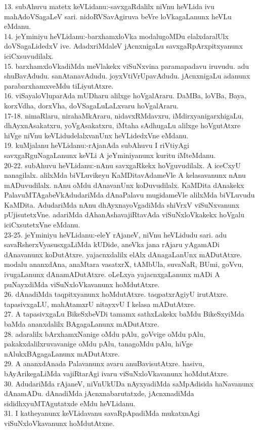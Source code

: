 \documentclass{article}
\begin{document}
13. subAhuvu matetx keVLidanu:-savxgaRdalilx niVnu heVLida ivu mahAdoVSagaLeV sari. nidoRVSavAgiruva beVre loVkagaLanunx heVLu eMdanu.\\
14. jeYminiyu heVLidanu:-barxhamxloVka modalugoMDu elalxdaralUlx doVSagaLidedxV ive. AdadxriMdaleV jAcnxnigaLu savxgaRpArxpitxyanunx iciCxsuvudilalx.\\
15. barxhamxloVkadiMda meVlakekx viSuNxvina paramapadavu iruvudu. adu shuBavAdudu. sanAtanavAdudu. joyxVtiVrUpavAdudu. jAcnxnigaLu adanunx parabarxhamxveMdu tiLiyutAtxre.\\
16. viSayaloVluparAda mUDharu alilxge hoVgalAraru. DaMBa, loVBa, Baya, korxVdha, dorxVha, doVSagaLuLaLxvaru hoVgalAraru.\\
17-18. nimaRlaru, nirahaMkAraru, nidavxRMdavxru, iMdirxyanigarxhigaLu, dhAyxnAsakatxru, yoVgAsakatxru, iMtaha sAdhugaLu alilxge hoVgutAtxre hiVge niVnu keVLidudelalxvanUnx heVLidedxVne eMdanu.\\
19. kuMjalanu heVLidanu:-rAjanAda subAhuvu I riVtiyAgi savxgaRguNagaLanunx keVLi A jeYminiyanunx kuritu iMteMdanu.\\
20-22. subAhuvu heVLidanu:-nAnu savxgaRkekx hoVguvudilalx. A iceCxyU nanagilalx. alilxMda biVLuvikeyu KaMDitavAdameVle A kelasavanunx nAnu mADuvudilalx. nAnu oMdu dAnavanUnx koDuvudilalx. KaMDita dAnakekx PalavuMTAgabeVkAdudariMda dAnaPalavu mugidameVle alilxMda biVLuvudu KaMDita. AdudariMda nAnu dhAyxnayoVgadiMda shiVrxV viSuNxvanunx pUjisutetxVne. adariMda dAhanAshavajiRtavAda viSuNxloVkakekx hoVgalu iciCxsutetxVne eMdanu.\\
23-25. jeYminiyu heVLidanu:-eleY rAjaneV, niVnu heVLidudu sari. adu savaRsherxVyasusxgaLiMda kUDide, aneVka jana rAjaru yAgamADi dAnavanunx koDutAtxre. yajacnxdalilx elAlx dAnagaLanUnx mADutAtxre. modalu ananxdAna, anaMtara vasatxrX, tAMbUla, suvaNaR, BUmi, goVvu, ivugaLanunx dAnamADutAtxre. oLeLxya yajacnxgaLanunx mADi A puNayxdiMda viSuNxloVkavanunx hoMdutAtxre.\\
26. dAnadiMda taqpitxyanunx hoMdutAtxre. taqpatxrAgiyU irutAtxre. tapasivxgaLU, mahAtamxrU nitayxvU I kelasa mADutAtxre.\\
27. A tapasivxgaLu BikeSxbeVDi tamamx sathxLakekx baMdu BikeSxyiMda baMda ananxdalilx BAgagaLanunx mADutAtxre.\\
28. adaralilx bArxhamxNanige oMdu pAlu, goVvige oMdu pAlu, pakakxdalilxruvavanige oMdu pAlu, tanagoMdu pAlu, hiVge nAlukxBAgagaLanunx mADutAtxre.\\
29. A ananxdAnada Palavanunx avaru anuBavisutAtxre. hasivu, bAyArikegaLiMda vajiRtarAgi ivaru viSuNxloVkavanunx hoMdutAtxre.\\
30. AdudariMda rAjaneV, niVnUkUDa nAyxyadiMda saMpAdisida haNavanunx dAnamADu. dAnadiMda jAcnxnabarutatxde, jAcnxnadiMda sididhxyuMTAgutatxde eMdu heVLidanu.\\
31. I katheyanunx keVLidavanu savaRpApadiMda mukatxnAgi viSuNxloVkavanunx hoMdutAtxne.
\end{document}
